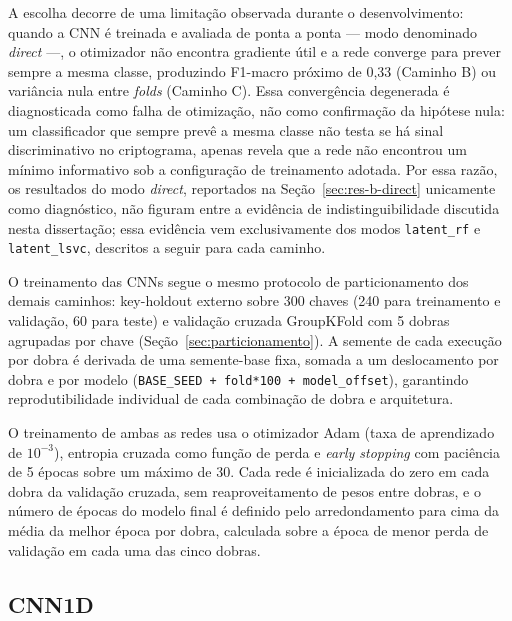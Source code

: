 A escolha decorre de uma limitação observada durante o desenvolvimento: quando a CNN é treinada e avaliada de ponta a ponta --- modo denominado \emph{direct} ---, o otimizador não encontra gradiente útil e a rede converge para prever sempre a mesma classe, produzindo F1-macro próximo de 0,33 (Caminho B) ou variância nula entre \emph{folds} (Caminho C). Essa convergência degenerada é diagnosticada como falha de otimização, não como confirmação da hipótese nula: um classificador que sempre prevê a mesma classe não testa se há sinal discriminativo no criptograma, apenas revela que a rede não encontrou um mínimo informativo sob a configuração de treinamento adotada. Por essa razão, os resultados do modo \emph{direct}, reportados na Seção~\ref{sec:res-b-direct} unicamente como diagnóstico, não figuram entre a evidência de indistinguibilidade discutida nesta dissertação; essa evidência vem exclusivamente dos modos \texttt{latent\_rf} e \texttt{latent\_lsvc}, descritos a seguir para cada caminho.

O treinamento das CNNs segue o mesmo protocolo de particionamento dos demais caminhos: key-holdout externo sobre 300 chaves (240 para treinamento e validação, 60 para teste) e validação cruzada GroupKFold com 5 dobras agrupadas por chave (Seção~\ref{sec:particionamento}). A semente de cada execução por dobra é derivada de uma semente-base fixa, somada a um deslocamento por dobra e por modelo (\texttt{BASE\_SEED + fold*100 + model\_offset}), garantindo reprodutibilidade individual de cada combinação de dobra e arquitetura.

O treinamento de ambas as redes usa o otimizador Adam (taxa de aprendizado de $10^{-3}$), entropia cruzada como função de perda e \emph{early stopping} com paciência de 5 épocas sobre um máximo de 30. Cada rede é inicializada do zero em cada dobra da validação cruzada, sem reaproveitamento de pesos entre dobras, e o número de épocas do modelo final é definido pelo arredondamento para cima da média da melhor época por dobra, calculada sobre a época de menor perda de validação em cada uma das cinco dobras.

\subsection{CNN1D}
\label{sec:cnn1d-caminho-b}

